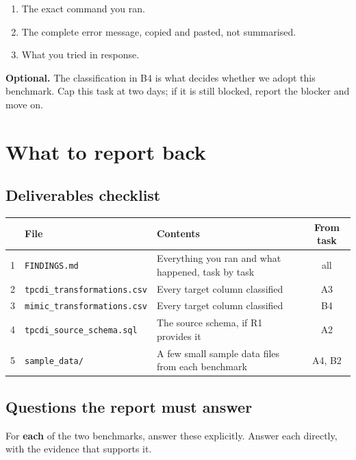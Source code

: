 \documentclass[11pt,a4paper]{article}
\newcommand{\code}[1]{\texttt{\small #1}}
\begin{document}
\begin{enumerate}
\item The exact command you ran.
\item The complete error message, copied and pasted, not summarised.
\item What you tried in response.
\end{enumerate}

\begin{notebox}
\textbf{Optional.} The classification in B4 is what decides whether we adopt this
benchmark. Cap this task at two days; if it is still blocked, report the blocker and move
on.
\end{notebox}

\clearpage
\section{What to report back}

\subsection{Deliverables checklist}

\begin{center}
\begin{tabular}{@{}clL{8.0cm}c@{}}
\toprule
& \textbf{File} & \textbf{Contents} & \textbf{From task} \\
 & \code{FINDINGS.md} & Everything you ran and what happened, task by task & all \\
2 & \code{tpcdi\_transformations.csv} & Every target column classified & A3 \\
3 & \code{mimic\_transformations.csv} & Every target column classified & B4 \\
4 & \code{tpcdi\_source\_schema.sql} & The source schema, if R1 provides it & A2 \\
5 & \code{sample\_data/} & A few small sample data files from each benchmark & A4, B2 \\
\bottomrule
\end{tabular}
\end{center}

\subsection{Questions the report must answer}

For \textbf{each} of the two benchmarks, answer these explicitly. Answer each directly, with the evidence that supports it.
\end{document}
